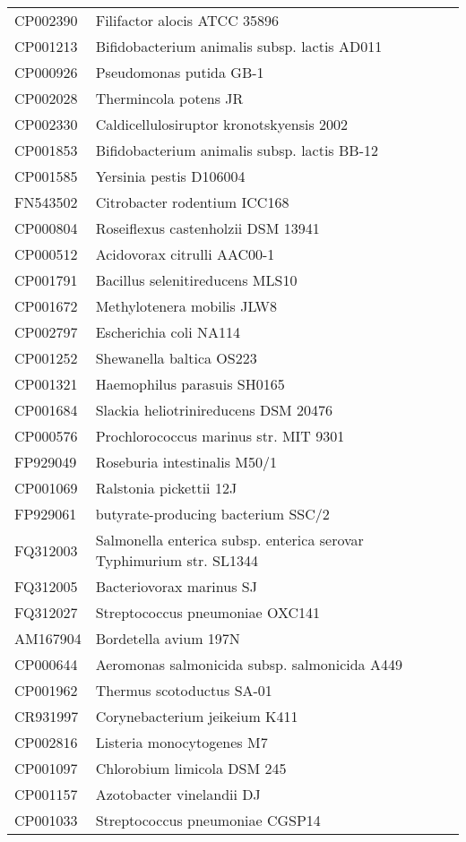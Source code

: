 \begin{longtable}{ll}
CP002390 & Filifactor alocis ATCC 35896\\
CP001213 & Bifidobacterium animalis subsp. lactis AD011\\
CP000926 & Pseudomonas putida GB-1\\
CP002028 & Thermincola potens JR\\
CP002330 & Caldicellulosiruptor kronotskyensis 2002\\
CP001853 & Bifidobacterium animalis subsp. lactis BB-12\\
CP001585 & Yersinia pestis D106004\\
FN543502 & Citrobacter rodentium ICC168\\
CP000804 & Roseiflexus castenholzii DSM 13941\\
CP000512 & Acidovorax citrulli AAC00-1\\
CP001791 & Bacillus selenitireducens MLS10\\
CP001672 & Methylotenera mobilis JLW8\\
CP002797 & Escherichia coli NA114\\
CP001252 & Shewanella baltica OS223\\
CP001321 & Haemophilus parasuis SH0165\\
CP001684 & Slackia heliotrinireducens DSM 20476\\
CP000576 & Prochlorococcus marinus str. MIT 9301\\
FP929049 & Roseburia intestinalis M50/1\\
CP001069 & Ralstonia pickettii 12J\\
FP929061 & butyrate-producing bacterium SSC/2\\
FQ312003 & Salmonella enterica subsp. enterica serovar Typhimurium str. SL1344\\
FQ312005 & Bacteriovorax marinus SJ\\
FQ312027 & Streptococcus pneumoniae OXC141\\
AM167904 & Bordetella avium 197N\\
CP000644 & Aeromonas salmonicida subsp. salmonicida A449\\
CP001962 & Thermus scotoductus SA-01\\
CR931997 & Corynebacterium jeikeium K411\\
CP002816 & Listeria monocytogenes M7\\
CP001097 & Chlorobium limicola DSM 245\\
CP001157 & Azotobacter vinelandii DJ\\
CP001033 & Streptococcus pneumoniae CGSP14\\

\end{longtable}
